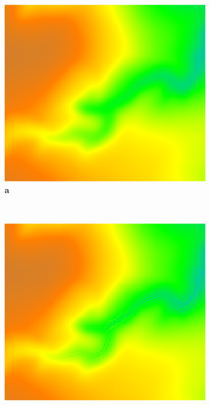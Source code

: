 \documentclass[final,3p,times,twocolumn]{elsarticle}
\begin{document}
\begin{figure}
\centering
%   
\begin{subfigure}[b]{0.3\textwidth}
\includegraphics[width=\textwidth]{images/lrwoods_elevation.png}
\label{fig_2_1}
\textbf{a} \\
\end{subfigure}
%
~ %
%
\begin{subfigure}[b]{0.3\textwidth}
\includegraphics[width=\textwidth]{images/lrwoods_dynamics_erdep_5m_30m.png}

\end{subfigure}
\end{figure}
\end{document}
